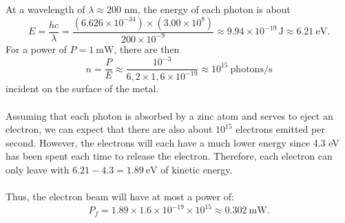 \begin{breakbox}
    \noindent At a wavelength of $\lambda \approx 200$ nm, the energy of each photon is about $$E = \frac{hc}{\lambda} = \frac{(6.626 \times 10^{-34}) \times (3.00 \times 10^8)}{200 \times 10^{-9}} \approx 9.94 \times 10^{-19} \, \mathrm{J} \approx 6.21\ \mathrm{eV}.$$
    For a power of $P = 1\ \mathrm{mW}$, there are then $$n = \frac{P}{E} \approx \frac{10^{-3}}{6,2\times 1,6 \times 10^{-19}} \approx 10^{15}\ \mathrm{photons/s}$$ incident on the surface of the metal.\\ \\
    Assuming that each photon is absorbed by a zinc atom and serves to eject an electron, we can expect that there are also about $10^{15}$ electrons emitted per second.
    However, the electrons will each have a much lower energy since 4.3 eV has been spent each time to release the electron.
    Therefore, each electron can only leave with $6.21 - 4.3 = 1.89\ \mathrm{eV}$ of kinetic energy.\\ \\
    Thus, the electron beam will have at most a power of: $$\boxed{P_f = 1.89 \times 1.6 \times 10^{-19}\times 10^{15} \approx 0.302\ \mathrm{mW}.}$$
\end{breakbox}
